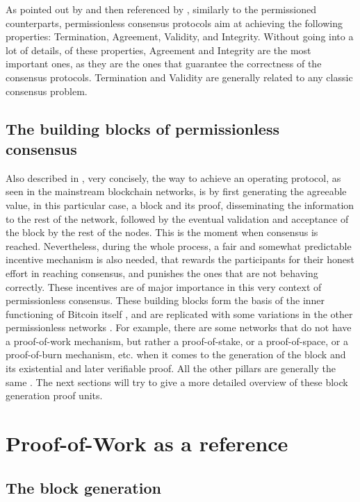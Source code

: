 \documentclass[journal]{IEEEtran}
\begin{document}
As pointed out by \cite{xiao2019distributed} and then referenced by \cite{survey-dist-consensus}, 
similarly to the permissioned counterparts, permissionless consensus protocols 
aim at achieving the following properties: Termination, Agreement, Validity, 
and Integrity. Without going into a lot of details, of these properties, 
Agreement and Integrity are the most important ones, as they are the ones that
guarantee the correctness of the consensus protocols. Termination and Validity
are generally related to any classic consensus problem.

\subsection{The building blocks of permissionless consensus}

Also described in \cite{survey-dist-consensus}, very concisely, the 
way to achieve an operating protocol, as seen in the mainstream blockchain
networks, is by first generating the agreeable value, 
in this particular case, a block and its proof, disseminating the information 
to the rest of the network, followed by the eventual validation and 
acceptance of the block by the rest of the nodes. This is the moment when consensus is reached.
Nevertheless, during the whole process, a fair and somewhat predictable incentive mechanism 
is also needed, that rewards the participants for their honest effort in reaching consensus, and
punishes the ones that are not behaving correctly. These incentives are of major importance
in this very context of permissionless consensus. 
These building blocks form the basis of the inner functioning of Bitcoin itself \cite{nakamoto2008bitcoin},
and are replicated with some variations in the other permissionless networks \cite{buterin2014next}.
For example, there are some networks that do not have a proof-of-work mechanism,
but rather a proof-of-stake, or a proof-of-space, or a proof-of-burn mechanism, etc.
when it comes to the generation of the block and its existential and later verifiable proof.
All the other pillars are generally the same \cite{survey-dist-consensus}.
The next sections will try to give a more detailed overview of these 
block generation proof units.

\section{Proof-of-Work as a reference}

\subsection{The block generation}
\end{document}
